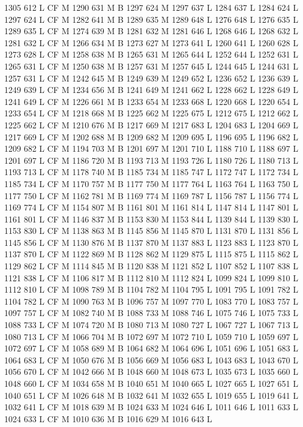 {{{{{{{{{{{{{{{{{{{{{{{{1305 612 L
CF M
1290 631 M B
1297 624 M 1297 637 L
1284 637 L
1284 624 L
1297 624 L
CF M
1282 641 M B
1289 635 M 1289 648 L
1276 648 L
1276 635 L
1289 635 L
CF M
1274 639 M B
1281 632 M 1281 646 L
1268 646 L
1268 632 L
1281 632 L
CF M
1266 634 M B
1273 627 M 1273 641 L
1260 641 L
1260 628 L
1273 628 L
CF M
1258 638 M B
1265 631 M 1265 644 L
1252 644 L
1252 631 L
1265 631 L
CF M
1250 638 M B
1257 631 M 1257 645 L
1244 645 L
1244 631 L
1257 631 L
CF M
1242 645 M B
1249 639 M 1249 652 L
1236 652 L
1236 639 L
1249 639 L
CF M
1234 656 M B
1241 649 M 1241 662 L
1228 662 L
1228 649 L
1241 649 L
CF M
1226 661 M B
1233 654 M 1233 668 L
1220 668 L
1220 654 L
1233 654 L
CF M
1218 668 M B
1225 662 M 1225 675 L
1212 675 L
1212 662 L
1225 662 L
CF M
1210 676 M B
1217 669 M 1217 683 L
1204 683 L
1204 669 L
1217 669 L
CF M
1202 688 M B
1209 682 M 1209 695 L
1196 695 L
1196 682 L
1209 682 L
CF M
1194 703 M B
1201 697 M 1201 710 L
1188 710 L
1188 697 L
1201 697 L
CF M
1186 720 M B
1193 713 M 1193 726 L
1180 726 L
1180 713 L
1193 713 L
CF M
1178 740 M B
1185 734 M 1185 747 L
1172 747 L
1172 734 L
1185 734 L
CF M
1170 757 M B
1177 750 M 1177 764 L
1163 764 L
1163 750 L
1177 750 L
CF M
1162 781 M B
1169 774 M 1169 787 L
1156 787 L
1156 774 L
1169 774 L
CF M
1154 807 M B
1161 801 M 1161 814 L
1147 814 L
1147 801 L
1161 801 L
CF M
1146 837 M B
1153 830 M 1153 844 L
1139 844 L
1139 830 L
1153 830 L
CF M
1138 863 M B
1145 856 M 1145 870 L
1131 870 L
1131 856 L
1145 856 L
CF M
1130 876 M B
1137 870 M 1137 883 L
1123 883 L
1123 870 L
1137 870 L
CF M
1122 869 M B
1128 862 M 1129 875 L
1115 875 L
1115 862 L
1129 862 L
CF M
1114 845 M B
1120 838 M 1121 852 L
1107 852 L
1107 838 L
1121 838 L
CF M
1106 817 M B
1112 810 M 1112 824 L
1099 824 L
1099 810 L
1112 810 L
CF M
1098 789 M B
1104 782 M 1104 795 L
1091 795 L
1091 782 L
1104 782 L
CF M
1090 763 M B
1096 757 M 1097 770 L
1083 770 L
1083 757 L
1097 757 L
CF M
1082 740 M B
1088 733 M 1088 746 L
1075 746 L
1075 733 L
1088 733 L
CF M
1074 720 M B
1080 713 M 1080 727 L
1067 727 L
1067 713 L
1080 713 L
CF M
1066 704 M B
1072 697 M 1072 710 L
1059 710 L
1059 697 L
1072 697 L
CF M
1058 689 M B
1064 682 M 1064 696 L
1051 696 L
1051 683 L
1064 683 L
CF M
1050 676 M B
1056 669 M 1056 683 L
1043 683 L
1043 670 L
1056 670 L
CF M
1042 666 M B
1048 660 M 1048 673 L
1035 673 L
1035 660 L
1048 660 L
CF M
1034 658 M B
1040 651 M 1040 665 L
1027 665 L
1027 651 L
1040 651 L
CF M
1026 648 M B
1032 641 M 1032 655 L
1019 655 L
1019 641 L
1032 641 L
CF M
1018 639 M B
1024 633 M 1024 646 L
1011 646 L
1011 633 L
1024 633 L
CF M
1010 636 M B
1016 629 M 1016 643 L
}}}}}}}}}}}}}}}}}}}}}}}}

